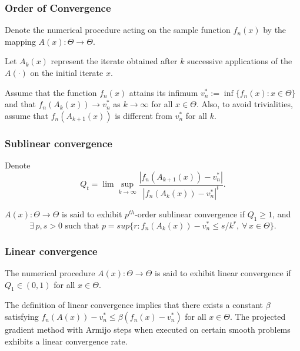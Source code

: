 \documentclass[usepdftitle=false, aspectratio=169]{beamer}
\begin{document}
\begin{frame}
\frametitle{Order of Convergence}

Denote the numerical procedure acting on the sample function $f_n(x)$ by the mapping
$A(x) : \Theta \rightarrow \Theta$.

\mbox{}

Let $A_k(x)$ represent the iterate obtained after $k$ successive applications
of the $A(\cdot)$ on the initial iterate $x$.

\mbox{}

Assume that the function $f_n(x)$ attains its infimum $v_n^{*} := \inf\{ f_n(x) : x \in \Theta\}$ and
that $f_n (A_k (x)) \rightarrow v_n^{*}$ as $k \rightarrow \infty$ for all $x \in \Theta$.
Also, to avoid trivialities, assume that
$f_n (A_{k+1} (x))$ is different from $v_n^*$ for all $k$.

\end{frame}

\begin{frame}
\frametitle{Sublinear convergence}

Denote
$$
Q_t = \lim \sup_{k \rightarrow \infty} \frac{ | f_n(A_{k+1} (x)) - v_n^* |}
{| f_n (A_k (x)) - v_n^* |^t}.
$$

\mbox{}

\begin{definition}
$A(x) : \Theta \rightarrow \Theta$ is said to exhibit $p^{th}$-order
sublinear convergence if $Q_1 \geq 1$, and
$$
\exists\,p, s > 0 \text{ such that } p = sup \{r : f_n(A_k (x)) - v^*_n \leq s/k^r,\ \forall\, x \in \Theta\}.
$$
\end{definition}

\end{frame}

\begin{frame}
\frametitle{Linear convergence}

\begin{definition}
The numerical procedure $A(x) : \Theta \rightarrow \Theta$ is said to exhibit linear convergence if $Q_1 \in (0, 1)$ for all $x \in \Theta$.
\end{definition}

\mbox{}

The definition of linear convergence implies that there exists a constant $\beta$ satisfying $f_n ( A (x)) - v_n^* \leq \beta (f_n(x) - v_n^*)$ for all $x \in \Theta$.
The projected gradient method with Armijo steps when executed on certain smooth problems exhibits a linear convergence rate.

\end{frame}
\end{document}
